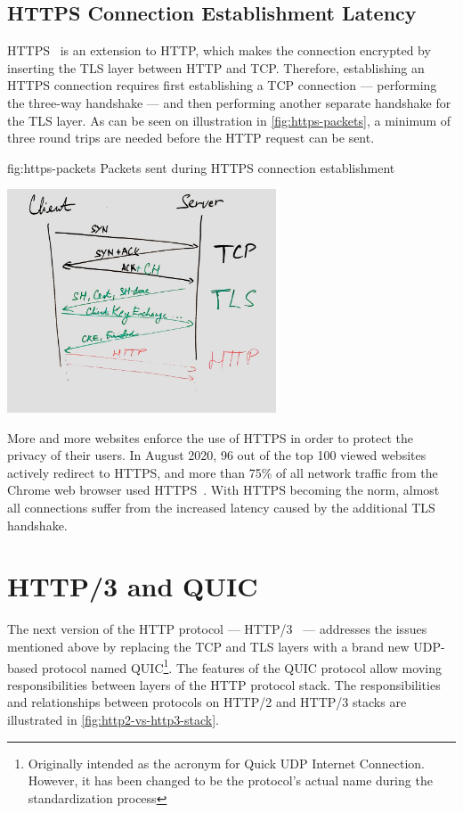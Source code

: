 \subsection*{HTTPS Connection Establishment Latency}

HTTPS~\cite{rfc2818} is an extension to HTTP, which makes the connection encrypted by inserting the
TLS layer between HTTP and TCP\@. Therefore, establishing an HTTPS connection requires first
establishing a TCP connection --- performing the three-way handshake --- and then performing another
separate handshake for the TLS layer. As can be seen on illustration in \autoref{fig:https-packets},
a minimum of three round trips are needed before the HTTP request can be sent.

\begin{myFigure}
  {fig:https-packets}
  {Packets sent during HTTPS connection establishment}

  \includegraphics[width=0.6\textwidth]{img/01-https-connection-packets}

\end{myFigure}

More and more websites enforce the use of HTTPS in order to protect the privacy of their users. In
August 2020, 96 out of the top 100 viewed websites actively redirect to HTTPS, and more than 75\% of
all network traffic from the Chrome web browser used HTTPS~\cite{googleTransparency}. With HTTPS
becoming the norm, almost all connections suffer from the increased latency caused by the additional
TLS handshake.

\section{HTTP/3 and QUIC}

The next version of the HTTP protocol --- HTTP/3~\cite{draft-ietf-quic-http} --- addresses the issues
mentioned above by replacing the TCP and TLS layers with a brand new UDP-based protocol named
QUIC\footnote{Originally intended as the acronym for Quick UDP Internet Connection. However, it has
been changed to be the protocol's actual name during the standardization process}. The features of
the QUIC protocol allow moving responsibilities between layers of the HTTP protocol stack. The
responsibilities and relationships between protocols on HTTP/2 and HTTP/3 stacks are illustrated in
\autoref{fig:http2-vs-http3-stack}.

